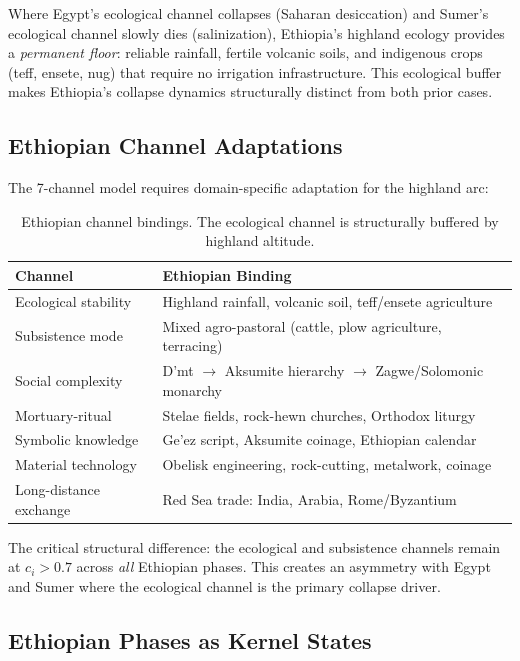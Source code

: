 \documentclass[
  aps,
  prd,
  twocolumn,
  superscriptaddress,
  nofootinbib,
  floatfix
]{revtex4-2}
\begin{document}
Where Egypt's ecological channel collapses (Saharan
desiccation) and Sumer's ecological channel slowly
dies (salinization), Ethiopia's highland ecology
provides a \emph{permanent floor}: reliable rainfall,
fertile volcanic soils, and indigenous crops (teff,
ensete, nug) that require no irrigation
infrastructure.  This ecological buffer makes
Ethiopia's collapse dynamics structurally distinct
from both prior cases.

\subsection{Ethiopian Channel
Adaptations}\label{sec:ethiopia-channels}

The 7-channel model requires domain-specific
adaptation for the highland arc:

\begin{table}[h]
\centering
\caption{Ethiopian channel bindings.  The ecological
channel is structurally buffered by highland
altitude.}
\label{tab:ethiopia-channels}
\begin{tabular}{@{}lp{4.2cm}@{}}
\toprule
Channel & Ethiopian Binding \\
\midrule
Ecological stability & Highland rainfall, volcanic
soil, teff/ensete agriculture \\
Subsistence mode & Mixed agro-pastoral (cattle,
plow agriculture, terracing) \\
Social complexity & D'mt $\to$ Aksumite hierarchy
$\to$ Zagwe/Solomonic monarchy \\
Mortuary-ritual & Stelae fields, rock-hewn churches,
Orthodox liturgy \\
Symbolic knowledge & Ge'ez script, Aksumite
coinage, Ethiopian calendar \\
Material technology & Obelisk engineering,
rock-cutting, metalwork, coinage \\
Long-distance exchange & Red Sea trade: India,
Arabia, Rome/Byzantium \\
\bottomrule
\end{tabular}
\end{table}

The critical structural difference: the ecological
and subsistence channels remain at $c_i > 0.7$
across \emph{all} Ethiopian phases.  This creates an
asymmetry with Egypt and Sumer where the ecological
channel is the primary collapse driver.

\subsection{Ethiopian Phases as Kernel
States}\label{sec:ethiopia-phases}
\end{document}
